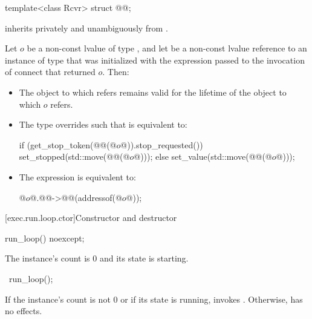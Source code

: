 \begin{itemdecl}
template<class Rcvr>
  struct @@;
\end{itemdecl}

\pnum
{}
inherits privately and unambiguously from .

\pnum
Let $o$ be a non-const lvalue of type ,
and let  be a non-const lvalue reference to an instance of type 
that was initialized with the expression 
passed to the invocation of connect that returned $o$.
Then:
\begin{itemize}
\item
The object to which  refers
remains valid for the lifetime of the object to which $o$ refers.
\item
The type  overrides
such that  is equivalent to:
\begin{codeblock}
if (get_stop_token(@@(@$o$@)).stop_requested()) {
  set_stopped(std::move(@@(@$o$@)));
} else {
  set_value(std::move(@@(@$o$@)));
}
\end{codeblock}
\item
The expression  is equivalent to:
\begin{codeblock}
@$o$@.@@->@@(addressof(@$o$@));
\end{codeblock}
\end{itemize}

[exec.run.loop.ctor]{Constructor and destructor}

%
\begin{itemdecl}
run_loop() noexcept;
\end{itemdecl}

\begin{itemdescr}
\pnum
\ensures
The  instance's count is 0 and
its state is starting.
\end{itemdescr}

%
\begin{itemdecl}
~run_loop();
\end{itemdecl}

\begin{itemdescr}
\pnum
\effects
If the  instance's count is not 0 or
if its state is running,
invokes .
Otherwise, has no effects.
\end{itemdescr}

